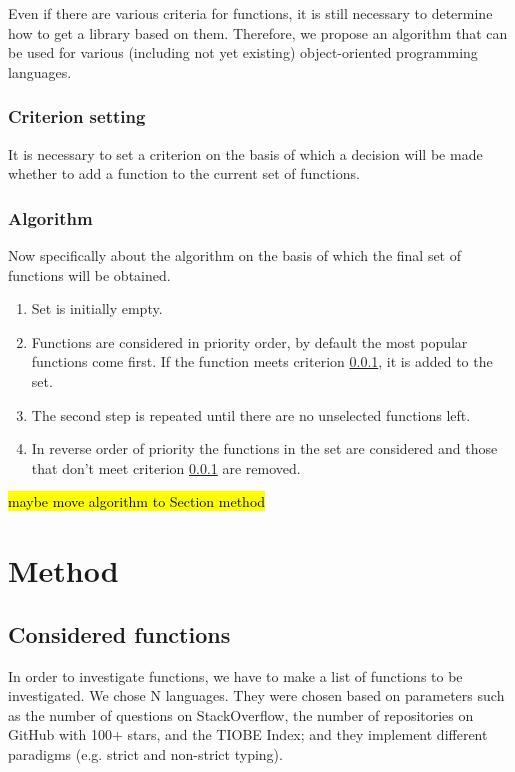 \documentclass[anonymous,sigplan,review,11pt,nonacm,natbib=false]{acmart}
\begin{document}
    Even if there are various criteria for functions, it is still necessary to determine how to get a library based on them. Therefore, we propose an algorithm that can be used for various (including not yet existing) object-oriented programming languages.

    \subsubsection{Criterion setting}

    \label{criterion}

    It is necessary to set a criterion on the basis of which a decision will be made whether to add a function to the current set of functions.

    \subsubsection{Algorithm}

    Now specifically about the algorithm on the basis of which the final set of functions will be obtained.

    \begin{enumerate}
        \item Set is initially empty.
        \item Functions are considered in priority order, by default the most popular functions come first. If the function meets criterion \ref{criterion}, it is added to the set.
        \item The second step is repeated until there are no unselected functions left.
        \item In reverse order of priority the functions in the set are considered and those that don't meet criterion \ref{criterion} are removed.
    \end{enumerate}

    \hl{maybe move algorithm to Section method}

    \section{Method}

    \subsection{Considered functions}

    In order to investigate functions, we have to make a list of functions to be investigated. We chose N languages. They were chosen based on parameters such as the number of questions on StackOverflow, the number of repositories on GitHub with 100+ stars, and the TIOBE Index; and they implement different paradigms (e.g. strict and non-strict typing).
\end{document}
